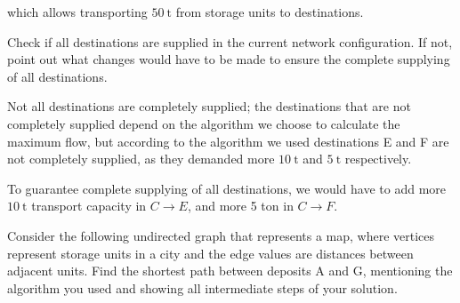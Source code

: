 {which allows transporting $\SI{50}{\tonne}$ from storage units to destinations.

Check if all destinations are supplied in the current network configuration. If not, point out what changes would have to be made to ensure the complete supplying of all destinations.

\ansseparator

Not all destinations are completely supplied; the destinations that are not completely supplied depend on the algorithm we choose to calculate the maximum flow, but according to the algorithm we used destinations E and F are not completely supplied, as they demanded more $\SI{10}{\tonne}$ and $\SI{5}{\tonne}$ respectively. 

To guarantee complete supplying of all destinations, we would have to add more $\SI{10}{\tonne}$ transport capacity in $C \rightarrow E$, and more 5 ton in $C \rightarrow F$.

Consider the following undirected graph that represents a map, where vertices represent storage units in a city and the edge values are distances between adjacent units. Find the shortest path between deposits A and G, mentioning the algorithm you used and showing all intermediate steps of your solution.

\begin{center}
\end{center}

}
